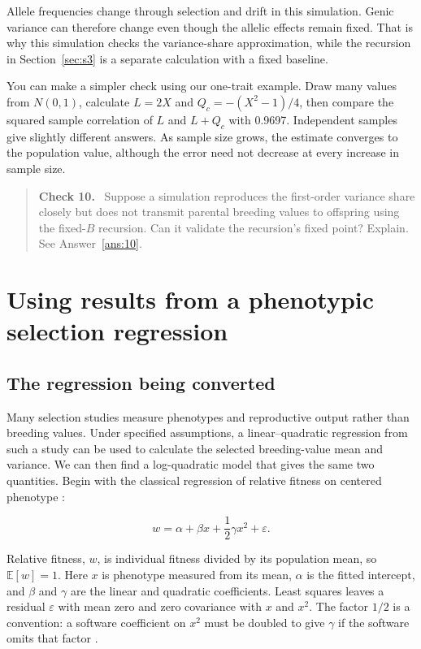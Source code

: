 \documentclass[11pt]{article}
\newcommand{\E}{\mathbb{E}}
\newenvironment{checkpoint}[1]
  {\begin{quote}\small\noindent\textbf{Check #1.}\ }
  {\end{quote}}
\newcounter{answer}
\begin{document}
Allele frequencies change through selection and drift in this simulation. Genic variance can therefore change even though the allelic effects remain fixed. That is why this simulation checks the variance-share approximation, while the recursion in Section~\ref{sec:s3} is a separate calculation with a fixed baseline.

You can make a simpler check using our one-trait example. Draw many values from $N(0,1)$, calculate $L=2X$ and $Q_c=-(X^2-1)/4$, then compare the squared sample correlation of $L$ and $L+Q_c$ with 0.9697. Independent samples give slightly different answers. As sample size grows, the estimate converges to the population value, although the error need not decrease at every increase in sample size.

\begin{checkpoint}{10}
Suppose a simulation reproduces the first-order variance share closely but
does not transmit parental breeding values to offspring using the fixed-$B$
recursion.  Can it validate the recursion's fixed point?  Explain.  See
Answer~\ref{ans:10}.
\end{checkpoint}

\section{Using results from a phenotypic selection regression}
\label{sec:s5}

\subsection{The regression being converted}

Many selection studies measure phenotypes and reproductive output rather than breeding values. Under specified assumptions, a linear--quadratic regression from such a study can be used to calculate the selected breeding-value mean and variance. We can then find a log-quadratic model that gives the same two quantities. Begin with the classical regression of relative fitness on centered phenotype \citep{LandeArnold1983}:

\begin{equation}
w=\alpha+\beta x+\frac12\gamma x^2+\varepsilon.
\label{eq:guide-LA}
\end{equation}

Relative fitness, $w$, is individual fitness divided by its population mean, so $\E[w]=1$. Here $x$ is phenotype measured from its mean, $\alpha$ is the fitted intercept, and $\beta$ and $\gamma$ are the linear and quadratic coefficients. Least squares leaves a residual $\varepsilon$ with mean zero and zero covariance with $x$ and $x^2$. The factor $1/2$ is a convention: a software coefficient on $x^2$ must be doubled to give $\gamma$ if the software omits that factor \citep{StinchcombeEtAl2008}.
\end{document}
